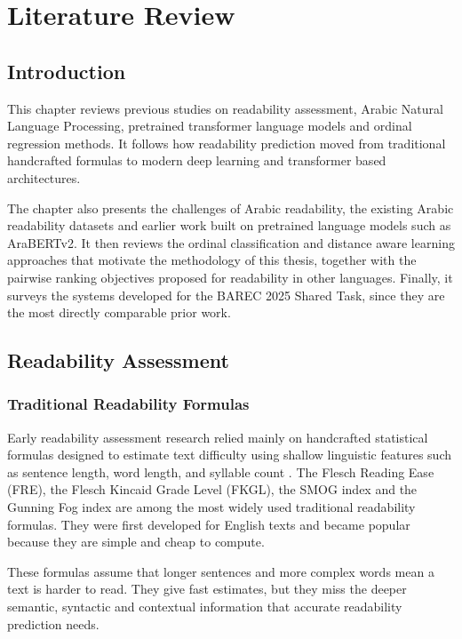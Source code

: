 \chapter{Literature Review}
\label{chap:relatedwork}
\section{Introduction}

This chapter reviews previous studies on readability assessment, Arabic Natural Language Processing, pretrained transformer language models and ordinal regression methods. It follows how readability prediction moved from traditional handcrafted formulas to modern deep learning and transformer based architectures.

The chapter also presents the challenges of Arabic readability, the existing Arabic readability datasets and earlier work built on pretrained language models such as AraBERTv2. It then reviews the ordinal classification and distance aware learning approaches that motivate the methodology of this thesis, together with the pairwise ranking objectives proposed for readability in other languages. Finally, it surveys the systems developed for the BAREC 2025 Shared Task, since they are the most directly comparable prior work.

\section{Readability Assessment}

\subsection{Traditional Readability Formulas}

Early readability assessment research relied mainly on handcrafted statistical formulas designed to estimate text difficulty using shallow linguistic features such as sentence length, word length, and syllable count \cite{dubay2004principles}.
The Flesch Reading Ease (FRE), the Flesch Kincaid Grade Level (FKGL), the SMOG index and the Gunning Fog index are among the most widely used traditional readability formulas. They were first developed for English texts and became popular because they are simple and cheap to compute.

These formulas assume that longer sentences and more complex words mean a text is harder to read. They give fast estimates, but they miss the deeper semantic, syntactic and contextual information that accurate readability prediction needs.

